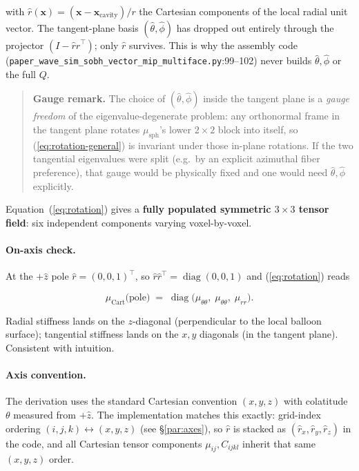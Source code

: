 \documentclass[11pt,letterpaper]{article}
\newenvironment{grayb}{\par\medskip\noindent\begin{quote}\small}{\end{quote}\medskip}
\newcommand{\vect}[1]{\boldsymbol{#1}}
\begin{document}
with $\hat r(\vect x) = (\vect x - \vect x_{\text{cavity}})/r$ the
Cartesian components of the local radial unit vector. The
tangent-plane basis $(\hat\theta,\hat\phi)$ has dropped out entirely
through the projector $(I - \hat r\hat r^{\!\top})$; only $\hat r$
survives. This is why the assembly code
(\texttt{paper\_wave\_sim\_sobh\_vector\_mip\_multiface.py}:99--102)
never builds $\hat\theta,\hat\phi$ or the full $Q$.

\begin{grayb}\textbf{Gauge remark.}
The choice of $(\hat\theta,\hat\phi)$ inside the tangent plane is a
\emph{gauge freedom} of the eigenvalue-degenerate problem: any
orthonormal frame in the tangent plane rotates $\mu_{\text{sph}}$'s
lower $2\times 2$ block into itself, so
(\ref{eq:rotation-general}) is invariant under those in-plane
rotations. If the two tangential eigenvalues were split (e.g.\ by an
explicit azimuthal fiber preference), that gauge would be
physically fixed and one would need $\hat\theta,\hat\phi$
explicitly.\end{grayb}

Equation~(\ref{eq:rotation}) gives a \textbf{fully populated
symmetric $3\times 3$ tensor field}: six independent components
varying voxel-by-voxel.

\paragraph{On-axis check.}
At the $+\hat z$ pole $\hat r = (0,0,1)^{\!\top}$, so
$\hat r\hat r^{\!\top} = \operatorname{diag}(0,0,1)$ and
(\ref{eq:rotation}) reads

\begin{equation}
\mu_{\text{Cart}}\bigl(\text{pole}\bigr)
\;=\;
\operatorname{diag}\bigl(\mu_{\theta\theta},\;\mu_{\theta\theta},\;\mu_{rr}\bigr).
\end{equation}

Radial stiffness lands on the $z$-diagonal (perpendicular to the
local balloon surface); tangential stiffness lands on the $x,y$
diagonals (in the tangent plane). Consistent with intuition.

\paragraph{Axis convention.}
The derivation uses the standard Cartesian convention $(x,y,z)$ with
colatitude $\theta$ measured from $+\hat z$. The implementation matches
this exactly: grid-index ordering
$(i,j,k) \leftrightarrow (x,y,z)$ (see \S\ref{par:axes}), so $\hat r$ is
stacked as $(\hat r_x, \hat r_y, \hat r_z)$ in the code, and all
Cartesian tensor components $\mu_{ij}, C_{ijkl}$ inherit that same
$(x, y, z)$ order.
\end{document}
